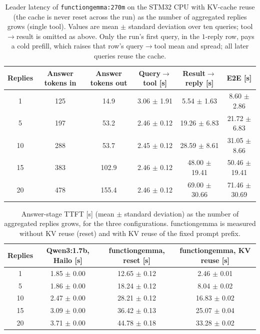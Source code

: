 \begin{table}[H]
\centering
\caption{Leader latency of \texttt{functiongemma:270m} on the STM32 CPU with
KV-cache reuse (the cache is never reset across the run) as the number of aggregated
replies grows (single tool). Values are mean $\pm$ standard deviation over ten
queries; tool$\rightarrow$result is omitted as above. Only the run's first query, in
the $1$-reply row, pays a cold prefill, which raises that row's
query$\rightarrow$tool mean and spread; all later queries reuse the cache.}
\label{tab:lat_replies_kvreuse}
\small
\begin{tabular}{cccccc}
\toprule
\textbf{Replies} & \textbf{Answer tokens in} & \textbf{Answer tokens out} & \textbf{Query$\rightarrow$tool [s]} & \textbf{Result$\rightarrow$reply [s]} & \textbf{E2E [s]} \\
\midrule
1 & 125 & 14.9 & 3.06 $\pm$ 1.91 & 5.54 $\pm$ 1.63 & 8.60 $\pm$ 2.86 \\
5 & 197 & 53.2 & 2.46 $\pm$ 0.12 & 19.26 $\pm$ 6.83 & 21.72 $\pm$ 6.83 \\
10 & 288 & 53.7 & 2.45 $\pm$ 0.12 & 28.59 $\pm$ 8.61 & 31.05 $\pm$ 8.66 \\
15 & 383 & 102.9 & 2.46 $\pm$ 0.12 & 48.00 $\pm$ 19.41 & 50.46 $\pm$ 19.41 \\
20 & 478 & 155.4 & 2.46 $\pm$ 0.12 & 69.00 $\pm$ 30.66 & 71.46 $\pm$ 30.69 \\
\bottomrule
\end{tabular}
\end{table}

\begin{table}[H]
\centering
\caption{Answer-stage TTFT [s] (mean $\pm$ standard deviation) as the number of
aggregated replies grows, for the three configurations. functiongemma is measured
without KV reuse (reset) and with KV reuse of the fixed prompt prefix.}
\label{tab:replies_cmp}
\begin{tabular}{cccc}
\toprule
\textbf{Replies} & \textbf{Qwen3:1.7b, Hailo [s]} & \textbf{functiongemma, reset [s]} & \textbf{functiongemma, KV reuse [s]} \\
\midrule
1 & 1.85 $\pm$ 0.00 & 12.65 $\pm$ 0.12 & 2.46 $\pm$ 0.01 \\
5 & 1.86 $\pm$ 0.00 & 18.24 $\pm$ 0.12 & 8.04 $\pm$ 0.02 \\
10 & 2.47 $\pm$ 0.00 & 28.21 $\pm$ 0.12 & 16.83 $\pm$ 0.02 \\
15 & 3.09 $\pm$ 0.00 & 36.42 $\pm$ 0.13 & 25.07 $\pm$ 0.04 \\
20 & 3.71 $\pm$ 0.00 & 44.78 $\pm$ 0.18 & 33.28 $\pm$ 0.02 \\
\bottomrule
\end{tabular}
\end{table}


